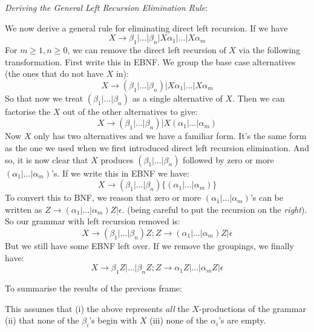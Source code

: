 \frmrule

\textit{Deriving the General Left Recursion Elimination Rule}:

We now derive a general rule for eliminating direct left recursion. 
If we have 
$$X \rightarrow  \beta_1 | ... | \beta_n | X\alpha_1 | ... | X\alpha_m $$
For $m \geqslant 1, n \geqslant 0$, we can remove the direct left recursion of $X$ 
via the following transformation. 
First write this in EBNF. We group 
the base case alternatives (the ones that do not have $X$ in):
$$ X \rightarrow (\beta_1 | ... | \beta_n) | X\alpha_1 | ... | X\alpha_m $$
So that now we treat $(\beta_1 | ... | \beta_n)$ as a single alternative of $X$. 
Then we can factorise the $X$ out of the other alternatives to give:
$$X \rightarrow (\beta_1 | ... | \beta_n) |  X(\alpha_1 | ... | \alpha_m)$$
Now $X$ only has two alternatives and we have a familiar form. 
It's the same form as the one we used when we first introduced 
direct left recursion elimination. And so, it is now clear that
$X$ produces $(\beta_1 | ... | \beta_n)$ followed by 
zero or more $(\alpha_1 | ... | \alpha_m)$'s. 
If we write this in EBNF we have:
$$X \rightarrow (\beta_1 | ... | \beta_n) \{(\alpha_1 | ... | \alpha_m)\}$$
To convert this to BNF, we reason that 
zero or more $(\alpha_1 | ... | \alpha_m)$'s
can be written as $Z \rightarrow (\alpha_1 | ... | \alpha_m) Z | \epsilon$. 
(being careful to put the recursion on the \textit{right}). 
So our grammar with left recursion removed is:
$$X \rightarrow (\beta_1 | ... | \beta_n)Z; Z \rightarrow (\alpha_1 | ... | \alpha_m) Z | \epsilon$$
But we still have some EBNF left over. If we remove the groupings, we finally have:
$$X \rightarrow \beta_1Z | ... | \beta_nZ; Z \rightarrow \alpha_1Z | ... | \alpha_mZ | \epsilon$$

\frmrule



To summarise the results of the previous frame:

This assumes that (i) the above represents \textit{all} the $X$-productions of the grammar 
(ii) that none of the $\beta_i$'s begin with $X$ (iii) none of the $\alpha_i$'s are empty.

